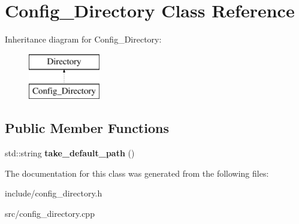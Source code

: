 \hypertarget{class_config___directory}{}\section{Config\+\_\+\+Directory Class Reference}
\label{class_config___directory}
Inheritance diagram for Config\+\_\+\+Directory\+:\begin{figure}[H]
\begin{center}
\leavevmode
\includegraphics[height=2.000000cm]{class_config___directory}
\end{center}
\end{figure}
\subsection*{Public Member Functions}
\begin{DoxyCompactItemize}
\item 
\mbox{\label{class_config___directory_ae51312baad8bbef3b29ab7a592b7e12f}} 
std\+::string {\bfseries take\+\_\+default\+\_\+path} ()
\end{DoxyCompactItemize}


The documentation for this class was generated from the following files\+:\begin{DoxyCompactItemize}
\item 
include/config\+\_\+directory.\+h\item 
src/config\+\_\+directory.\+cpp\end{DoxyCompactItemize}

